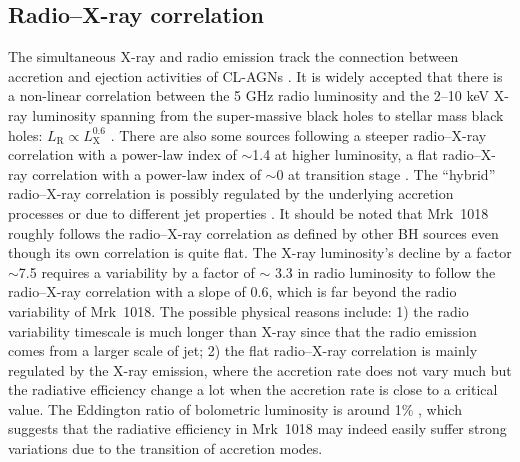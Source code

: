 \subsection{Radio--X-ray correlation}
The simultaneous X-ray and radio emission track the connection between accretion and ejection activities of CL-AGNs \citep[e.g.][]{2016MNRAS.460..304K,2021MNRAS.tmp..700Y}.
It is widely accepted that there is a non-linear correlation between the 5 GHz radio luminosity and the 2--10 keV X-ray luminosity spanning from the super-massive black holes to stellar mass black holes: $L_\mathrm{R}\propto L_\mathrm{X}^{0.6}$ \citep[e.g.][]{2003MNRAS.345.1057M,2004A&A...414..895F}. There are also some sources following a steeper radio--X-ray correlation with a power-law index of $\sim$1.4 at higher luminosity, a flat radio--X-ray correlation with a power-law index of $\sim$0 at transition stage \citep[e.g.][]{2011MNRAS.414..677C,2014ApJ...788...52C,2016MNRAS.463.2287X}. The ``hybrid'' radio--X-ray correlation is possibly regulated by the underlying accretion processes \citep[e.g.][]{2016MNRAS.456.4377X} or due to different jet properties \citep[e.g.][]{2018MNRAS.481.4513I,2018MNRAS.473.4122E}. It should be noted that Mrk~1018 roughly follows the radio--X-ray correlation as defined by other BH sources \citep{2012MNRAS.419..267P} even though its own correlation is quite flat. The X-ray luminosity's decline by a factor $\sim $7.5 requires a variability by a factor of $\sim$ 3.3 in radio luminosity to follow the radio--X-ray correlation with a slope of $0.6$, which is far beyond the radio variability of Mrk~1018. The possible physical reasons include: 1) the radio variability timescale is much longer than X-ray since that the radio emission comes from a larger scale of jet; 2) the flat radio--X-ray correlation is mainly regulated by the X-ray emission, where the accretion rate does not vary much but the radiative efficiency change a lot when the accretion rate is close to a critical value. The Eddington ratio of bolometric luminosity is around 1\% \citep[][]{2018MNRAS.480.3898N}, which suggests that the radiative efficiency in Mrk~1018 may indeed easily suffer strong variations due to the transition of accretion modes. 
  




